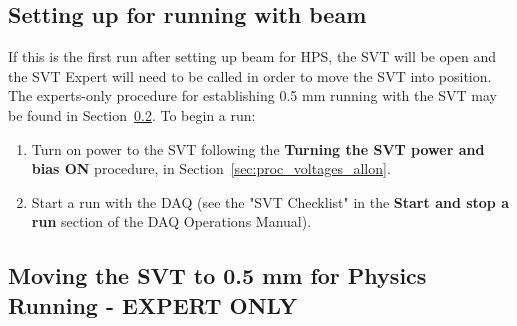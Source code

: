 \documentclass[12pt]{report}
\begin{document}

\subsection{Setting up for running with beam}
\label{sec:proc_general_startrun}
If this is the first run after setting up beam for HPS, the SVT will be open and the SVT Expert will need to be called in order to move the SVT into position. The experts-only procedure for establishing 0.5 mm running with the SVT may be found in Section~\ref{sec:proc_svt_0.5mm}.  To begin a run:
\begin{enumerate}
\item Turn on power to the SVT following the \textbf{Turning the SVT power and bias ON} procedure, in Section~\ref{sec:proc_voltages_allon}.
\item Start a run with the DAQ (see the "SVT Checklist" in the \textbf{Start and stop a run} section of the DAQ Operations Manual).
\end{enumerate}

\subsection{Moving the SVT to 0.5 mm for Physics Running - \textbf{EXPERT ONLY}}
\label{sec:proc_svt_0.5mm}
\end{document}
